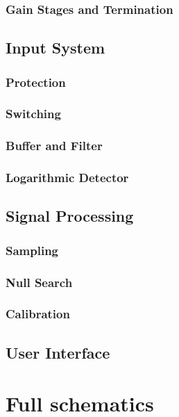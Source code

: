 \documentclass[article,oneside]{memoir}
\begin{document}
\begin{multicols}{2}
\subsection{Gain Stages and Termination}

\section{Input System}

\subsection{Protection}
\subsection{Switching}
\subsection{Buffer and Filter}
\subsection{Logarithmic Detector}

\section{Signal Processing}
\subsection{Sampling}
\subsection{Null Search}
\subsection{Calibration}

\section{User Interface}

\end{multicols}

\newpage
\chapter{Full schematics}
\end{document}
